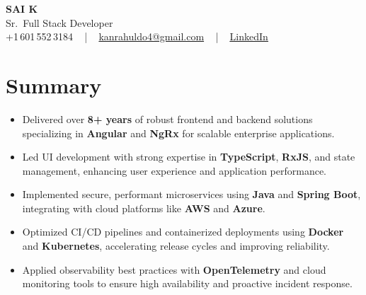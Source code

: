 \documentclass[letterpaper,11pt]{article}
\newcommand{\resumeItem}[1]{
  \item\footnotesize{
    {#1 \vspace{-2pt}}
  }
}
\newcommand{\resumeItemListStart}{\begin{itemize}[leftmargin=*]}
\newcommand{\resumeItemListEnd}{\end{itemize}\vspace{-5pt}}
\begin{document}
\begin{center}
    {\fontsize{14pt}{12pt}\selectfont \textbf{\MakeUppercase{Sai K}}}\\ \vspace{2pt}
    \fontsize{10pt}{12pt}\selectfont Sr.\ Full Stack Developer\\ \vspace{2pt}
    \fontsize{10pt}{12pt}\selectfont +1\,601\,552\,3184 ~ | ~
    \href{mailto:kanrahuldo4@gmail.com}{kanrahuldo4@gmail.com} ~ | ~
    \href{https://www.linkedin.com/in/srrrk/}{\color{blue}\underline{LinkedIn}}
    \vspace{-10pt}
\end{center}

\section{Summary}
\fontsize{9pt}{10pt}\selectfont
\resumeItemListStart
  \resumeItem{Delivered over \textbf{8+ years} of robust frontend and backend solutions specializing in \textbf{Angular} and \textbf{NgRx} for scalable enterprise applications.}
  \resumeItem{Led UI development with strong expertise in \textbf{TypeScript}, \textbf{RxJS}, and state management, enhancing user experience and application performance.}
  \resumeItem{Implemented secure, performant microservices using \textbf{Java} and \textbf{Spring Boot}, integrating with cloud platforms like \textbf{AWS} and \textbf{Azure}.}
  \resumeItem{Optimized CI/CD pipelines and containerized deployments using \textbf{Docker} and \textbf{Kubernetes}, accelerating release cycles and improving reliability.}
  \resumeItem{Applied observability best practices with \textbf{OpenTelemetry} and cloud monitoring tools to ensure high availability and proactive incident response.}
\resumeItemListEnd
\vspace{-6pt}

\end{document}
